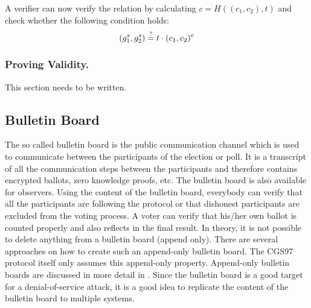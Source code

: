 \documentclass[numbers=noenddot, abstract=on, a4paper, headsepline,
footsepline, oneside, draft=off]{scrreprt}
\begin{document}
A verifier can now verify the relation by calculating
$c=H((c_1,c_2),t)$ and check whether the following condition holds:
\begin{equation}
	(g_1^s, g_2^s) \stackrel{?}{=} t \cdot (c_1, c_2)^c \notag
\end{equation}


\subsubsection{Proving Validity.}
This section needs to be written. 


\subsection{Bulletin Board}
\label{sec:bulletinboard}
The so called bulletin board is the public communication channel which is used
to communicate between the participants of the election or poll. It is a
transcript of all the communication steps between the participants and therefore
contains encrypted ballots, zero knowledge proofs, etc. The bulletin board is
also available for observers. Using the content of the bulletin board, everybody
can verify that all the participants are following the protocol or that
dishonest participants are excluded from the voting process. A voter can verify
that his/her own ballot is counted properly and also reflects in the final
result. In theory, it is not possible to delete anything from a bulletin board
(append only). There are several approaches on how to create such an
append-only bulletin board. The CGS97 protocol itself only assumes this
append-only property. Append-only bulletin boards are discussed in more detail
in \cite{HL09}. Since the bulletin board is a good target for a
denial-of-service attack, it is a good idea to replicate the content of the bulletin board to multiple systems.
\end{document}
